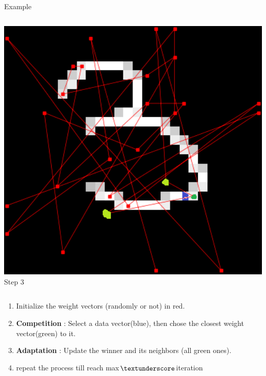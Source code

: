 \documentclass{beamer}
\begin{document}
\begin{frame}{Example}
\begin{columns}
    
			\begin{column}{0.33\textwidth}
      
				\centering
      				\includegraphics[width=1\textwidth]{pics/algo_1_3.png}
Step 3
    			\end{column}
		\end{columns}




               	\begin{enumerate}

                        \item Initialize the weight vectors (randomly or not) in red.
			\item \textbf{Competition} : Select a data vector(blue), then chose the closest weight vector(green) to it.
			\item \textbf{Adaptation} : Update the winner and its neighbors (all green ones).
                        \item repeat the process till reach max$\textunderscore$iteration
                \end{enumerate}
        \end{frame}
\end{document}
